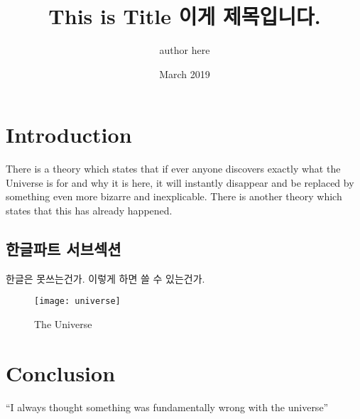 \documentclass{article}
\title{This is Title 이게 제목입니다.}
\author{author here }
\date{March 2019}
\begin{document}
\maketitle

\section{Introduction}
There is a theory which states that if ever anyone discovers exactly what the Universe is for and why it is here, it will instantly disappear and be replaced by something even more bizarre and inexplicable.
There is another theory which states that this has already happened. 

\subsection{한글파트 서브섹션}
한글은 못쓰는건가. 이렇게 하면 쓸 수 있는건가.

\begin{figure}[h!]
\centering
\texttt{[image: universe]}
\caption{The Universe}
\label{fig:universe}
\end{figure}

\section{Conclusion}
``I always thought something was fundamentally wrong with the universe'' \citep{adams1995hitchhiker}



\end{document}
